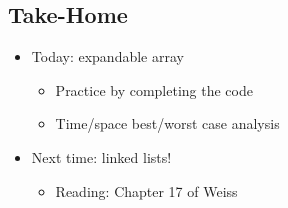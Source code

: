 \documentclass[10pt]{article}
\begin{document}
\subsection*{Take-Home}
\begin{itemize}
    \item Today: expandable array
    \begin{itemize}
        \item Practice by completing the code
        \item Time/space best/worst case analysis
    \end{itemize}
    \item Next time: linked lists!
    \begin{itemize}
        \item Reading: Chapter 17 of Weiss
    \end{itemize}
\end{itemize}
\end{document}
